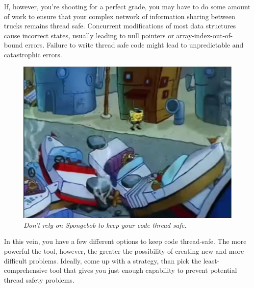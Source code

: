 \documentclass[11pt]{article}
\begin{document}
If, however, you're shooting for a perfect grade, you may have to do some amount of work to ensure that your complex network of information sharing between trucks remains thread safe. Concurrent modifications of most data structures cause incorrect states, usually leading to null pointers or array-index-out-of-bound errors. Failure to write thread safe code might lead to unpredictable and catastrophic errors.\\
\begin{figure}[h]
\centerline{\includegraphics[scale=0.45]{collision.png}} 
\caption{\em{Don't rely on Spongebob to keep your code thread safe.}}
\end{figure}

In this vein, you have a few different options to keep code thread-safe. The more powerful the tool, however, the greater the possibility of creating new and more difficult problems. Ideally, come up with a strategy, than pick the least-comprehensive tool that gives you just enough capability to prevent potential thread safety problems.
\end{document}
